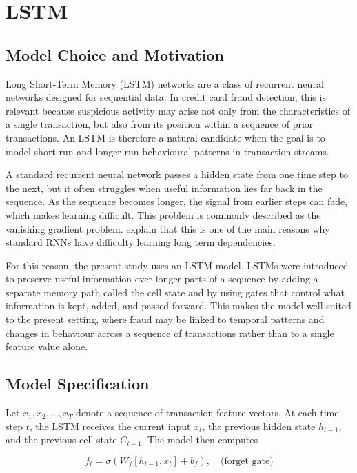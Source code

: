 \documentclass[oneside,12pt,parskip=half,american,numbers=noenddot]{scrreprt}
\begin{document}
\section{LSTM}
\label{sec:lstm}

\subsection{Model Choice and Motivation}
Long Short-Term Memory (LSTM) networks are a class of recurrent neural networks designed for sequential data. In credit card fraud detection, this is relevant because suspicious activity may arise not only from the characteristics of a single transaction, but also from its position within a sequence of prior transactions. An LSTM is therefore a natural candidate when the goal is to model short-run and longer-run behavioural patterns in transaction streams.

A standard recurrent neural network passes a hidden state from one time step to the next, but it often struggles when useful information lies far back in the sequence. As the sequence becomes longer, the signal from earlier steps can fade, which makes learning difficult. This problem is commonly described as the vanishing gradient problem. \textcite{olah_understanding_2015} explain that this is one of the main reasons why standard RNNs have difficulty learning long term dependencies.

For this reason, the present study uses an LSTM model. LSTMs were introduced to preserve useful information over longer parts of a sequence by adding a separate memory path called the cell state and by using gates that control what information is kept, added, and passed forward. This makes the model well suited to the present setting, where fraud may be linked to temporal patterns and changes in behaviour across a sequence of transactions rather than to a single feature value alone.

\subsection{Model Specification}

Let $x_1, x_2, \dots, x_T$ denote a sequence of transaction feature vectors. At each time step $t$, the LSTM receives the current input $x_t$, the previous hidden state $h_{t-1}$, and the previous cell state $C_{t-1}$. The model then computes

\[
f_t = \sigma \left( W_f [h_{t-1}, x_t] + b_f \right), \quad \text{(forget gate)}
\]
\end{document}
